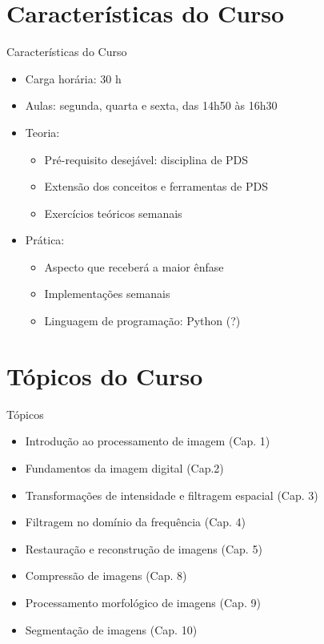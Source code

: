   \section[ slide = true]{Características do Curso}
      \begin{slide}[toc=]{Características do Curso}
         \begin{itemize}[type=1]
            \item Carga horária: 30 h%
            \item Aulas: segunda, quarta e sexta, das 14h50 às 16h30%
            \item Teoria:
            \begin{itemize}
               \item Pré-requisito desejável: disciplina de PDS
               \item Extensão dos conceitos e ferramentas de PDS
               \item Exercícios teóricos semanais %
            \end{itemize}
            \item Prática:
            \begin{itemize}
               \item Aspecto que receberá a maior ênfase
               \item Implementações semanais 
               \item Linguagem de programação: Python (?)
            \end{itemize}
         \end{itemize}         
      \end{slide}

   \section[ slide = true]{Tópicos do Curso}
   \begin{slide}[toc=]{Tópicos}
      \begin{itemize}[type=1]
         \item Introdução ao processamento de imagem (Cap. 1)
         \item Fundamentos da imagem digital (Cap.2)
         \item Transformações de intensidade e filtragem espacial (Cap. 3)
         \item Filtragem no domínio da frequência (Cap. 4) 
         \item Restauração e reconstrução de imagens (Cap. 5)
         \item Compressão de imagens (Cap. 8)
         \item Processamento morfológico de imagens (Cap. 9)
         \item Segmentação de imagens (Cap. 10)
      \end{itemize}
   \end{slide}

